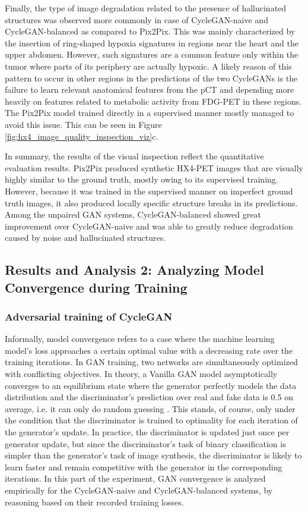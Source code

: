 Finally, the type of image degradation related to the presence of hallucinated structures was observed more commonly in case of CycleGAN-naive and CycleGAN-balanced as compared to Pix2Pix. This was mainly characterized by the insertion of ring-shaped hypoxia signatures in regions near the heart and the upper abdomen. However, such signatures are a common feature only within the tumor where parts of its periphery are actually hypoxic. A likely reason of this pattern to occur in other regions in the predictions of the two CycleGANs is the failure to learn relevant anatomical features from the pCT and depending more heavily on features related to metabolic activity from FDG-PET in these regions. The Pix2Pix model trained directly in a supervised manner mostly managed to avoid this issue. This can be seen in Figure \ref{fig:hx4_image_quality_inspection_viz}c.

In summary, the results of the visual inspection reflect the quantitative evaluation results. Pix2Pix produced synthetic HX4-PET images that are visually highly similar to the ground truth, mostly owing to its supervised training. However, because it was trained in the supervised manner on imperfect ground truth images, it also produced locally specific structure breaks in its predictions. Among the unpaired GAN systems, CycleGAN-balanced showed great improvement over CycleGAN-naive and was able to greatly reduce degradation caused by noise and hallucinated structures.


\subsection{Results and Analysis 2: Analyzing Model Convergence during Training}
\label{cycelgan_convergence}


\subsubsection{Adversarial training of CycleGAN} 
Informally, model convergence refers to a case where the machine learning model's loss approaches a certain optimal value with a decreasing rate over the training iterations. In GAN training, two networks are simultaneously optimized with conflicting objectives. In theory, a Vanilla GAN model asymptotically converges to an equilibrium state where the generator perfectly models the data distribution and the discriminator's prediction over real and fake data is 0.5 on average, i.e. it can only do random guessing \cite{goodfellow2014generative}. This stands, of course, only under the condition that the discriminator is trained to optimality for each iteration of the generator's update. In practice, the discriminator is updated just once per generator update, but since the discriminator's task of binary classification is simpler than the generator's task of image synthesis, the discriminator is likely to learn faster and remain competitive with the generator in the corresponding iterations. In this part of the experiment, GAN convergence is analyzed empirically for the CycleGAN-naive and CycleGAN-balanced systems, by reasoning based on their recorded training losses.

